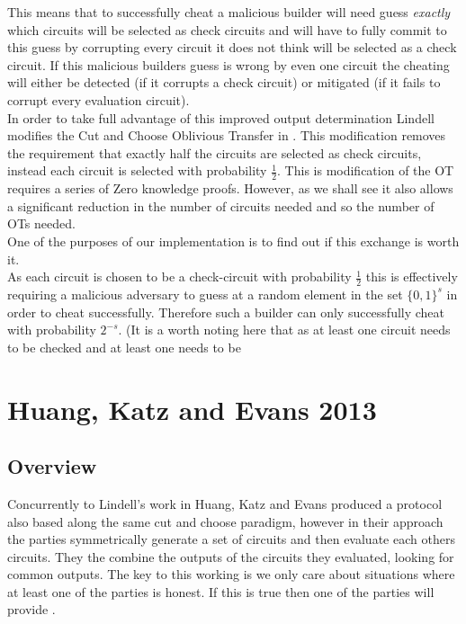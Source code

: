 \documentclass[ %
                    author={Nicholas Tutte},
                supervisor={Prof. Nigel Smart},
                    degree={MEng},
                     title={Secure Two Party Computation},
                  subtitle={A practical comparison of recent protocols},
                      type={Research - GG1K},
                      year={2015} ]{dissertation}
\begin{document}
				This means that to successfully cheat a malicious builder will need guess \emph{exactly} which circuits will be selected as check circuits and will have to fully commit to this guess by corrupting every circuit it does not think will be selected as a check circuit. If this malicious builders guess is wrong by even one circuit the cheating will either be detected (if it corrupts a check circuit) or mitigated (if it fails to corrupt every evaluation circuit).\\

				In order to take full advantage of this improved output determination Lindell modifies the Cut and Choose Oblivious Transfer in \cite{LindellAndPinkas2011}. This modification removes the requirement that exactly half the circuits are selected as check circuits, instead each circuit is selected with probability $\frac{1}{2}$. This is modification of the OT requires a series of Zero knowledge proofs. However, as we shall see it also allows a significant reduction in the number of circuits needed and so the number of OTs needed.\\

				One of the purposes of our implementation is to find out if this exchange is worth it.\\

				As each circuit is chosen to be a check-circuit with probability $\frac{1}{2}$ this is effectively requiring a malicious adversary to guess at a random element in the set $\{0, 1\}^s$ in order to cheat successfully. Therefore such a builder can only successfully cheat with probability $2^{-s}$. (It is a worth noting here that as at least one circuit needs to be checked and at least one needs to be \\

				\subsubsection{}

		\section{Huang, Katz and Evans 2013}
			\subsection*{Overview}

				Concurrently to Lindell's work in \cite{Lindell_CnC_2013} Huang, Katz and Evans produced a protocol also based along the same cut and choose paradigm, however in their approach the parties symmetrically generate a set of circuits and then evaluate each others circuits. They the combine the outputs of the circuits they evaluated, looking for common outputs. The key to this working is we only care about situations where at least one of the parties is honest. If this is true then one of the parties will provide .\\
\end{document}
